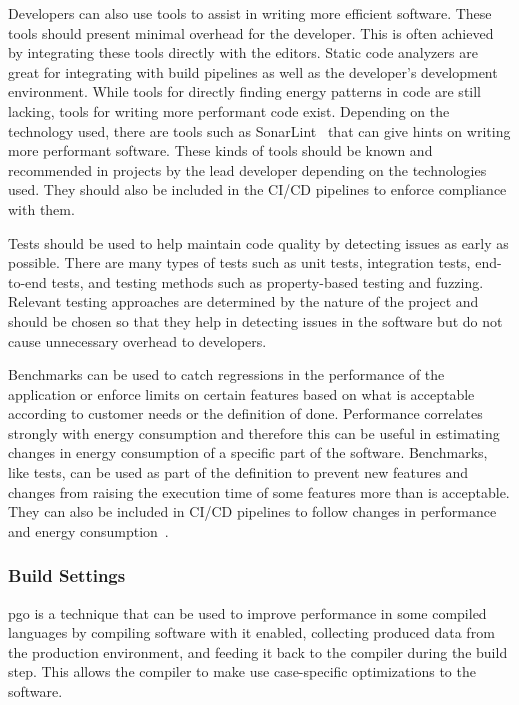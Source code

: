 Developers can also use tools to assist in writing more efficient software. These tools should present minimal overhead for the developer. This is often achieved by integrating these tools directly with the editors. Static code analyzers are great for integrating with build pipelines as well as the developer's development environment. While tools for directly finding energy patterns in code are still lacking, tools for writing more performant code exist. Depending on the technology used, there are tools such as SonarLint~\cite{sonarsourceLinterTool} that can give hints on writing more performant software. These kinds of tools should be known and recommended in projects by the lead developer depending on the technologies used. They should also be included in the CI/CD pipelines to enforce compliance with them.

Tests should be used to help maintain code quality by detecting issues as early as possible. There are many types of tests such as unit tests, integration tests, end-to-end tests, and testing methods such as property-based testing and fuzzing. Relevant testing approaches are determined by the nature of the project and should be chosen so that they help in detecting issues in the software but do not cause unnecessary overhead to developers.

Benchmarks can be used to catch regressions in the performance of the application or enforce limits on certain features based on what is acceptable according to customer needs or the definition of done. Performance correlates strongly with energy consumption and therefore this can be useful in estimating changes in energy consumption of a specific part of the software. Benchmarks, like tests, can be used as part of the definition to prevent new features and changes from raising the execution time of some features more than is acceptable. They can also be included in CI/CD pipelines to follow changes in performance and energy consumption~\cite{twinsorfalseffriends}.

\subsubsection{Build Settings}
\gls{pgo} is a technique that can be used to improve performance in some compiled languages by compiling software with it enabled, collecting produced data from the production environment, and feeding it back to the compiler during the build step. This allows the compiler to make use case-specific optimizations to the software.

